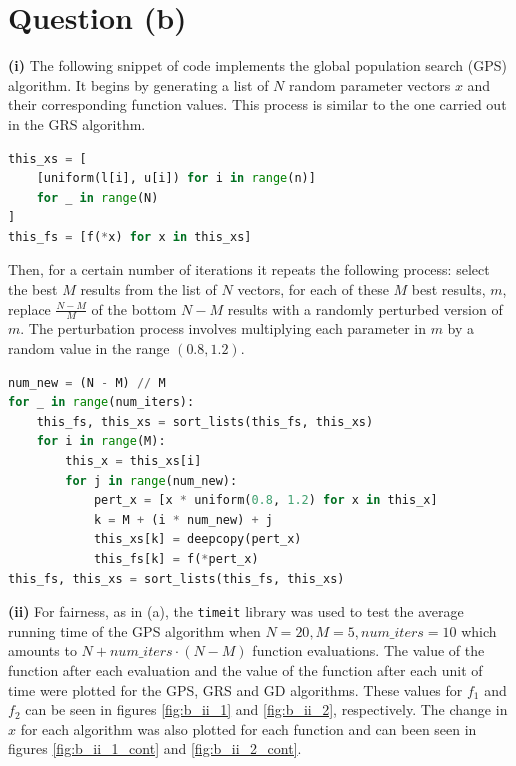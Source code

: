\documentclass[12pt]{article}
\begin{document}
\section*{Question (b)}

\noindent \textbf{(i)} The following snippet of code implements the global population search (GPS) algorithm. It begins by generating a list of $N$ random parameter vectors $x$ and their corresponding function values. This process is similar to the one carried out in the GRS algorithm.

\lstset{basicstyle=\footnotesize}
\begin{lstlisting}[language=Python]
this_xs = [
    [uniform(l[i], u[i]) for i in range(n)]
    for _ in range(N)
]
this_fs = [f(*x) for x in this_xs]
\end{lstlisting}

Then, for a certain number of iterations it repeats the following process: select the best $M$ results from the list of $N$ vectors, for each of these $M$ best results, $m$, replace $\frac{N-M}{M}$ of the bottom $N - M$ results with a randomly perturbed version of $m$. The perturbation process involves multiplying each parameter in $m$ by a random value in the range $(0.8, 1.2)$.

\lstset{basicstyle=\footnotesize}
\begin{lstlisting}[language=Python]
num_new = (N - M) // M
for _ in range(num_iters):
    this_fs, this_xs = sort_lists(this_fs, this_xs)
    for i in range(M):
        this_x = this_xs[i]
        for j in range(num_new):
            pert_x = [x * uniform(0.8, 1.2) for x in this_x]
            k = M + (i * num_new) + j
            this_xs[k] = deepcopy(pert_x)
            this_fs[k] = f(*pert_x)
this_fs, this_xs = sort_lists(this_fs, this_xs)
\end{lstlisting}

\noindent \textbf{(ii)} For fairness, as in (a), the \texttt{timeit} library was used to test the average running time of the GPS algorithm when $N = 20, M = 5, num\_iters = 10$ which amounts to $N + num\_iters \cdot (N - M)$ function evaluations. The value of the function after each evaluation and the value of the function after each unit of time were plotted for the GPS, GRS and GD algorithms. These values for $f_1$ and $f_2$ can be seen in figures \ref{fig:b_ii_1} and \ref{fig:b_ii_2}, respectively. The change in $x$ for each algorithm was also plotted for each function and can been seen in figures \ref{fig:b_ii_1_cont} and \ref{fig:b_ii_2_cont}.
\end{document}
